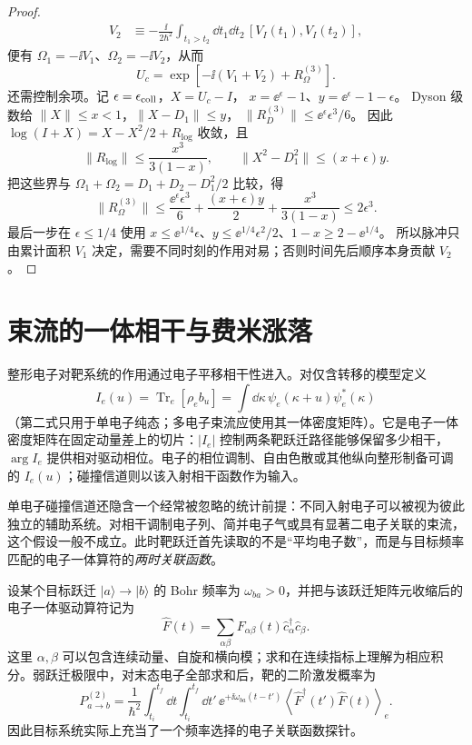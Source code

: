 \begin{proof}
\begin{align*}
 V_2&\equiv-\frac{\ii}{2\hbar^2}
 \int_{t_1>t_2}\dd t_1\dd t_2\,
 [V_I(t_1),V_I(t_2)],
\end{align*}
便有 $\Omega_1=-\ii V_1$、$\Omega_2=-\ii V_2$，从而
\begin{equation*}
 U_c
 =\exp\!\left[-\ii(V_1+V_2)+R_\Omega^{(3)}\right].
\end{equation*}
还需控制余项。记 $\epsilon=\epsilon_{\rm coll}$，$X=U_c-I$，
$x=\ee^\epsilon-1$、$y=\ee^\epsilon-1-\epsilon$。
Dyson 级数给 $\|X\|\le x<1$，$\|X-D_1\|\le y$，
$\|R_D^{(3)}\|\le\ee^\epsilon\epsilon^3/6$。
因此 $\log(I+X)=X-X^2/2+R_{\log}$ 收敛，且
\[
\|R_{\log}\|\le\frac{x^3}{3(1-x)},\qquad
\|X^2-D_1^2\|\le(x+\epsilon)y.
\]
把这些界与 $\Omega_1+\Omega_2=D_1+D_2-D_1^2/2$ 比较，得
\[
\|R_\Omega^{(3)}\|\le\frac{\ee^\epsilon\epsilon^3}{6}
+\frac{(x+\epsilon)y}{2}+\frac{x^3}{3(1-x)}\le2\epsilon^3.
\]
最后一步在 $\epsilon\le1/4$ 使用
$x\le\ee^{1/4}\epsilon$、$y\le\ee^{1/4}\epsilon^2/2$、$1-x\ge2-\ee^{1/4}$。
所以脉冲只由累计面积 $V_1$ 决定，需要不同时刻的作用对易；否则时间先后顺序本身贡献 $V_2$。
\end{proof}


\section{束流的一体相干与费米涨落}

整形电子对靶系统的作用通过电子平移相干性进入。对仅含转移的模型定义
\begin{equation*}
I_e(u)=\operatorname{Tr}_e[\rho_e b_u]
=\int\dd \kappa\,\psi_e(\kappa+u)\psi_e^*(\kappa)
\end{equation*}
（第二式只用于单电子纯态；多电子束流应使用其一体密度矩阵）。它是电子一体密度矩阵在固定动量差上的切片：$|I_e|$ 控制两条靶跃迁路径能够保留多少相干，$\arg I_e$ 提供相对驱动相位。电子的相位调制、自由色散或其他纵向整形制备可调的 $I_e(u)$；碰撞信道则以该入射相干函数作为输入。

单电子碰撞信道还隐含一个经常被忽略的统计前提：不同入射电子可以被视为彼此独立的辅助系统。对相干调制电子列、简并电子气或具有显著二电子关联的束流，这个假设一般不成立。此时靶跃迁首先读取的不是“平均电子数”，而是与目标频率匹配的电子一体算符的\emph{两时关联函数}。

设某个目标跃迁 $|a\rangle\to|b\rangle$ 的 Bohr 频率为 $\omega_{ba}>0$，并把与该跃迁矩阵元收缩后的电子一体驱动算符记为
\begin{equation}
{
\hat F(t)
=\sum_{\alpha\beta}F_{\alpha\beta}(t)
\hat c_\alpha^\dagger\hat c_\beta .}
\label{eq:fermionic_beam_onebody_drive_operator}
\end{equation}
这里 $\alpha,\beta$ 可以包含连续动量、自旋和横向模；求和在连续指标上理解为相应积分。弱跃迁极限中，对末态电子全部求和后，靶的二阶激发概率为
\begin{equation}
{
P_{a\to b}^{(2)}
=\frac{1}{\hbar^2}
\int_{t_i}^{t_f}\dd t\int_{t_i}^{t_f}\dd t'\,
\ee^{+\ii\omega_{ba}(t-t')}
\left\langle
\hat F^\dagger(t')\hat F(t)
\right\rangle_e .}
\label{eq:target_excitation_fermionic_beam_correlator}
\end{equation}
因此目标系统实际上充当了一个频率选择的电子关联函数探针。


